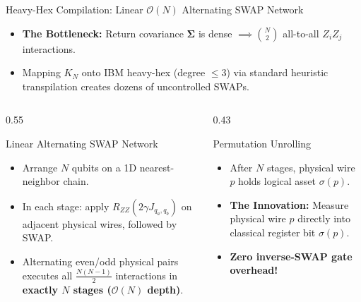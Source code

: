 \documentclass[aspectratio=169,10pt]{beamer}
\begin{document}
\begin{frame}{Heavy-Hex Compilation: Linear $\mathcal{O}(N)$ Alternating SWAP Network}
\begin{itemize}
    \item \textbf{The Bottleneck:} Return covariance $\boldsymbol{\Sigma}$ is dense $\implies \binom{N}{2}$ all-to-all $Z_i Z_j$ interactions.
    \item Mapping $K_N$ onto IBM heavy-hex (degree $\le 3$) via standard heuristic transpilation creates dozens of uncontrolled SWAPs.
\end{itemize}

\vspace{0.2cm}
\begin{columns}
\begin{column}{0.55\textwidth}
\begin{block}{Linear Alternating SWAP Network}
\begin{itemize}
    \item Arrange $N$ qubits on a 1D nearest-neighbor chain.
    \item In each stage: apply $R_{ZZ}(2\gamma J_{q_a, q_b})$ on adjacent physical wires, followed by SWAP.
    \item Alternating even/odd physical pairs executes all $\frac{N(N-1)}{2}$ interactions in \textbf{exactly $N$ stages ($\mathcal{O}(N)$ depth)}.
\end{itemize}
\end{block}
\end{column}

\begin{column}{0.43\textwidth}
\begin{block}{Permutation Unrolling}
\begin{itemize}
    \item After $N$ stages, physical wire $p$ holds logical asset $\sigma(p)$.
    \item \textbf{The Innovation:} Measure physical wire $p$ directly into classical register bit $\sigma(p)$.
    \item \textbf{Zero inverse-SWAP gate overhead!}
\end{itemize}
\end{block}
\end{column}
\end{columns}
\end{frame}
\end{document}
